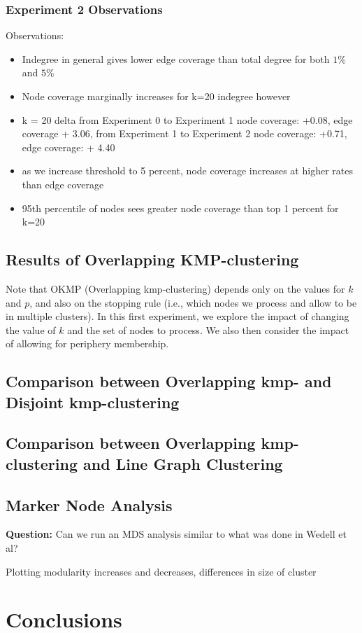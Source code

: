 \documentclass{article}
\begin{document}
\subsubsection{Experiment 2 Observations}

Observations:
\begin{itemize}
	\item Indegree in general gives lower edge coverage than total degree for both $1\%$ and $5\%$
	\item Node coverage marginally increases for k=20 indegree however
	\item k = 20 delta from Experiment 0 to Experiment 1 node coverage: +0.08, edge coverage + 3.06, from Experiment 1 to Experiment 2 node coverage: +0.71, edge coverage: + 4.40
	\item as we increase threshold to 5 percent, node coverage increases at higher rates than edge coverage
	\item 95th percentile of nodes sees greater node coverage  than top 1 percent for k=20
\end{itemize}



\subsection{Results of Overlapping KMP-clustering}
Note that OKMP (Overlapping kmp-clustering) depends only on the values for $k$ and $p$, and also on the stopping rule (i.e., which nodes we process and allow to be in multiple clusters). In this first experiment, we explore the impact of changing the value of $k$ and the set of nodes to process.
We also then consider the impact of allowing for periphery membership.



\subsection{Comparison between Overlapping kmp- and Disjoint kmp-clustering}

\subsection{Comparison between Overlapping kmp-clustering and Line Graph Clustering}



\subsection{Marker Node Analysis}

\textbf{Question:} Can we run an MDS analysis similar to what was done in Wedell et al?


Plotting modularity increases and decreases, differences in size of cluster

\section{Conclusions}


\end{document}
